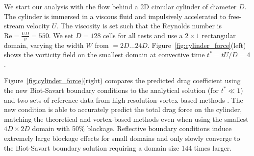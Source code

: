 \documentclass[final,1p,times]{elsarticle}
\begin{document}
We start our analysis with the flow behind a 2D circular cylinder of diameter $D$. The cylinder is immersed in a viscous fluid and impulsively accelerated to free-stream velocity $U$. The viscosity is set such that the Reynolds number is $\text{Re}=\frac{UD}{\nu}=550$. We set $D=128$ cells for all tests and use a $2\times 1$ rectangular domain, varying the width $W$ from $=2D\ldots 24D$. Figure~\ref{fig:cylinder_force}(left) shows the vorticity field on the smallest domain at convective time $t^*=tU/D=4$.

Figure~\ref{fig:cylinder_force}(right) compares the predicted drag coefficient using the new Biot-Savart boundary conditions to the analytical solution \cite{Collins1973TheCylinder} (for $t^*\ll 1$) and two sets of reference data from high-resolution vortex-based methods \cite{KoumoutsakostAN1995High-resolutionMethods, Gillis2019AMethod}. The new condition is able to accurately predict the total drag force on the cylinder, matching the theoretical and vortex-based methods even when using the smallest $4D\times2D$ domain with 50\% blockage. 
Reflective boundary conditions induce extremely large blockage effects for small domains and only slowly converge to the Biot-Savart boundary solution requiring a domain size 144 times larger. %

\end{document}
